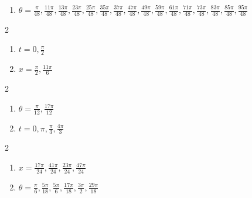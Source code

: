 \documentclass{ximera}
\begin{document}
\begin{enumerate}

\setcounter{enumi}{\value{HW}}

\item $\theta = \frac{\pi}{48}, \frac{11\pi}{48}, \frac{13\pi}{48}, \frac{23\pi}{48}, \frac{25\pi}{48}, \frac{35\pi}{48}, \frac{37\pi}{48}, \frac{47\pi}{48}, \frac{49\pi}{48}, \frac{59\pi}{48}, \frac{61\pi}{48}, \frac{71\pi}{48}, \frac{73\pi}{48}, \frac{83\pi}{48}, \frac{85\pi}{48}, \frac{95\pi}{48}$

\setcounter{HW}{\value{enumi}}

\end{enumerate}

\begin{multicols}{2}

\begin{enumerate}

\setcounter{enumi}{\value{HW}}

\item $t = 0, \frac{\pi}{2}$ 
\item  $x = \frac{\pi}{2}, \frac{11\pi}{6}$

\setcounter{HW}{\value{enumi}}

\end{enumerate}

\end{multicols}

\begin{multicols}{2}

\begin{enumerate}

\setcounter{enumi}{\value{HW}}

\item  $\theta = \frac{\pi}{12}, \frac{17\pi}{12}$
\item  $t = 0, \pi, \frac{\pi}{3}, \frac{4\pi}{3}$

\setcounter{HW}{\value{enumi}}

\end{enumerate}

\end{multicols}

\begin{multicols}{2}

\begin{enumerate}

\setcounter{enumi}{\value{HW}}

\item  $x = \frac{17 \pi}{24}, \frac{41 \pi}{24}, \frac{23\pi}{24}, \frac{47\pi}{24}$
\item $\theta = \frac{\pi}{6}, \frac{5\pi}{18}, \frac{5\pi}{6}, \frac{17\pi}{18}, \frac{3\pi}{2}, \frac{29\pi}{18}$

\setcounter{HW}{\value{enumi}}

\end{enumerate}

\end{multicols}
\end{document}
